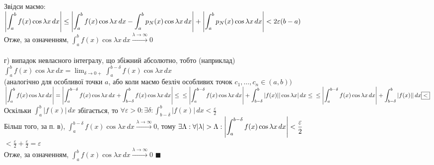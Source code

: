 \documentclass[a4paper, 14pt]{extarticle}
\def\hugespace{\vspace{5mm} \\}
\begin{document}
Звідси маємо:\\
$\displaystyle \abs{\int_a^b f(x) \cos \lambda x \,dx} \leq \abs{\int_a^b f(x) \cos \lambda x \,dx-\int_a^b p_N(x) \cos \lambda x \,dx} + \abs{\int_a^b p_N(x) \cos \lambda x \,dx} \\ < 2\varepsilon(b-a)$\\
Отже, за означенням, $\displaystyle \int_a^b f(x) \cos \lambda x \,dx \overset{\lambda \to \infty}{\to} 0$\\
\hugespace
г) випадок невласного інтегралу, що збіжний абсолютно, тобто (наприклад) \\ $\displaystyle \int_a^b f(x) \cos \lambda x \,dx = \lim_{\delta \to 0+} \int_a^{b-\delta} f(x) \cos \lambda x \,dx$
\\
(аналогічно для особливої точки $a$, або коли маємо безліч особливих точок $c_1,\dots,c_n \in (a,b))$\\
$\displaystyle \abs{\int_a^b f(x) \cos \lambda x \,dx} = \abs{\int_a^{b-\delta} f(x) \cos \lambda x \,dx + \int_{b-\delta}^b f(x) \cos \lambda x \,dx} \leq \\ \leq \abs{\int_a^{b-\delta} f(x) \cos \lambda x \,dx} + \int_{b-\delta}^b |f(x)| |\cos \lambda x| \,dx \leq \\ \leq \abs{\int_a^{b-\delta} f(x) \cos \lambda x \,dx} + \int_{b-\delta}^b |f(x)| | \,dx \boxed{<}$\\
Оскільки $\displaystyle \int_a^b |f(x)|\,dx$ збігається, то $\displaystyle \forall \varepsilon>0: \exists \delta: \int_{b-\delta}^b |f(x)|\,dx < \frac{\varepsilon}{2}$\\
Більш того, за п. в), $\displaystyle \int_a^{b-\delta} f(x) \cos \lambda x \,dx \overset{\lambda \to \infty}{\to} 0$, тому $\displaystyle \exists \Lambda: \forall |\lambda|>\Lambda: \abs{\int_a^{b-\delta} f(x) \cos \lambda x \,dx} < \frac{\varepsilon}{2}$\\
$\displaystyle \boxed{<} \frac{\varepsilon}{2} + \frac{\varepsilon}{2} = \varepsilon$\\
Отже, за означенням, $\displaystyle \int_a^b f(x) \cos \lambda x \,dx \overset{\lambda \to \infty}{\to} 0$ $\blacksquare$
\hugespace
\end{document}
